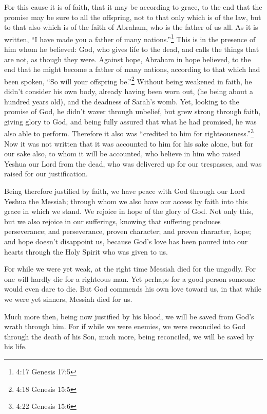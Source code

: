 \myverse{}For this cause it is of faith, that it may be according to grace,
to the end that the promise may be sure to all the offspring, not to that only which is of the law, but
to that also which is of the faith of Abraham, who is the father of us all.
\myverse{}As it is written, “I have made you a father of many nations.”\footnote{4:17 Genesis 17:5} This is in the presence of him whom he believed:
God, who gives life to the dead, and calls the things that are not, as though they were.
\myverse{}Against hope, Abraham in hope believed, to the end that he might become a
father of many nations, according to that which had been spoken, “So will your offspring be.”\footnote{4:18 Genesis 15:5}
\myverse{}Without being weakened in faith, he didn’t consider his own body, already
having been worn out, (he being about a hundred years old), and the deadness of Sarah’s womb.
\myverse{}Yet, looking to the promise of God, he didn’t waver through unbelief, but
grew strong through faith, giving glory to God,
\myverse{}and being fully assured that what he had promised, he was also able to perform.
\myverse{}Therefore it also was “credited to him for righteousness.”\footnote{4:22 Genesis 15:6}
\myverse{}Now it was not written that it was accounted to him for his sake alone,
\myverse{}but for our sake also, to whom it will be accounted, who believe in him who
raised Yeshua our Lord from the dead,
\myverse{}who was delivered up for our trespasses, and was raised for our justification.


\mychapter{} \myverse*{}Being therefore justified by faith, we have peace with God through
our Lord Yeshua the Messiah;
\myverse{}through whom we also have our access by faith into this grace in which we stand.
We rejoice in hope of the glory of God.
\myverse{}Not only this, but we also rejoice in our sufferings, knowing that suffering
produces perseverance;
\myverse{}and perseverance, proven character; and proven character, hope;
\myverse{}and hope doesn’t disappoint us, because God’s love has been poured into our
hearts through the Holy Spirit who was given to us.

\myverse{}For while we were yet weak, at the right time Messiah died for
the ungodly.
\myverse{}For one will hardly die for a righteous man. Yet perhaps for a good person someone
would even dare to die.
\myverse{}But God commends his own love toward us, in that while we were yet sinners,
Messiah died for us.

\myverse{}Much more then, being now justified by his blood, we will be saved
from God’s wrath through him.
\myverse{}For if while we were enemies, we were reconciled to God through the death
of his Son, much more, being reconciled, we will be saved by his life.

